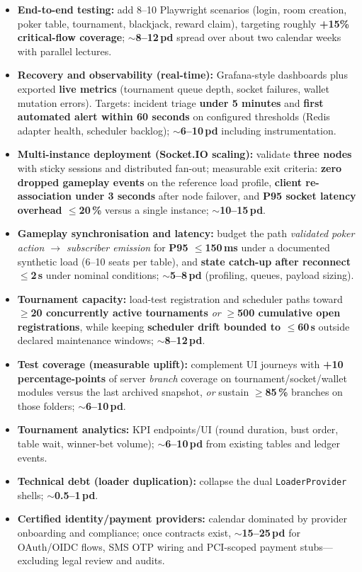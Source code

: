 \documentclass[11pt,a4paper]{article}
\begin{document}
\begin{itemize}
\item \textbf{End-to-end testing:} add 8--10 Playwright scenarios (login, room creation, poker table, tournament, blackjack, reward claim), targeting roughly \textbf{+15\% critical-flow coverage}; \textbf{$\sim$8--12\,pd} spread over about two calendar weeks with parallel lectures.
\item \textbf{Recovery and observability (real-time):} Grafana-style dashboards plus exported \textbf{live metrics} (tournament queue depth, socket failures, wallet mutation errors). Targets: incident triage \textbf{under 5 minutes} and \textbf{first automated alert within 60 seconds} on configured thresholds (Redis adapter health, scheduler backlog); \textbf{$\sim$6--10\,pd} including instrumentation.
\item \textbf{Multi-instance deployment (Socket.IO scaling):} validate \textbf{three nodes} with sticky sessions and distributed fan-out; measurable exit criteria: \textbf{zero dropped gameplay events} on the reference load profile, \textbf{client re-association under 3 seconds} after node failover, and \textbf{P95 socket latency overhead $\leq$20\,\%} versus a single instance; \textbf{$\sim$10--15\,pd}.
\item \textbf{Gameplay synchronisation and latency:} budget the path \emph{validated poker action $\rightarrow$ subscriber emission} for \textbf{P95 $\leq$150\,ms} under a documented synthetic load (6--10 seats per table), and \textbf{state catch-up after reconnect $\leq$2\,s} under nominal conditions; \textbf{$\sim$5--8\,pd} (profiling, queues, payload sizing).
\item \textbf{Tournament capacity:} load-test registration and scheduler paths toward \textbf{$\geq$20 concurrently active tournaments} \emph{or} \textbf{$\geq$500 cumulative open registrations}, while keeping \textbf{scheduler drift bounded to $\leq$60\,s} outside declared maintenance windows; \textbf{$\sim$8--12\,pd}.
\item \textbf{Test coverage (measurable uplift):} complement UI journeys with \textbf{+10 percentage-points} of server \emph{branch} coverage on tournament/socket/wallet modules versus the last archived snapshot, \emph{or} sustain \textbf{$\geq$85\,\%} branches on those folders; \textbf{$\sim$6--10\,pd}.
\item \textbf{Tournament analytics:} KPI endpoints/UI (round duration, bust order, table wait, winner-bet volume); \textbf{$\sim$6--10\,pd} from existing tables and ledger events.
\item \textbf{Technical debt (loader duplication):} collapse the dual \texttt{LoaderProvider} shells; \textbf{$\sim$0.5--1\,pd}.
\item \textbf{Certified identity/payment providers:} calendar dominated by provider onboarding and compliance; once contracts exist, \textbf{$\sim$15--25\,pd} for OAuth/OIDC flows, SMS OTP wiring and PCI-scoped payment stubs---excluding legal review and audits.
\end{itemize}
\end{document}
